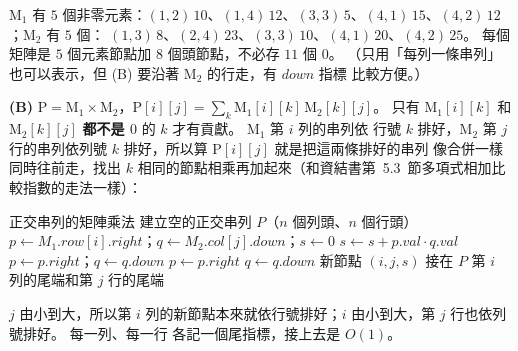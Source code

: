 \begin{pastsoln}
$\mathrm{M}_1$ 有 $5$ 個非零元素：$(1,2)\,10$、$(1,4)\,12$、$(3,3)\,5$、$(4,1)\,15$、$(4,2)\,12$；$\mathrm{M}_2$ 有 $5$ 個：
$(1,3)\,8$、$(2,4)\,23$、$(3,3)\,10$、$(4,1)\,20$、$(4,2)\,25$。 每個矩陣是 $5$ 個元素節點加 $8$ 個頭節點，不必存
$11$ 個 $0$。 （只用「每列一條串列」也可以表示，但 (B) 要沿著 $\mathrm{M}_2$ 的行走，有 $\mathit{down}$ 指標
比較方便。）

\textbf{(B)} $\mathrm{P} = \mathrm{M}_1 \times \mathrm{M}_2$，$\mathrm{P}[i][j] = \sum_k \mathrm{M}_1[i][k]\,\mathrm{M}_2[k][j]$。
只有 $\mathrm{M}_1[i][k]$ 和 $\mathrm{M}_2[k][j]$ \textbf{都不是 $0$} 的 $k$ 才有貢獻。 $\mathrm{M}_1$ 第 $i$ 列的串列依
行號 $k$ 排好，$\mathrm{M}_2$ 第 $j$ 行的串列依列號 $k$ 排好，所以算 $\mathrm{P}[i][j]$ 就是把這兩條排好的串列
像合併一樣同時往前走，找出 $k$ 相同的節點相乘再加起來（和資結書第~5.3~節多項式相加比較指數的走法一樣）：

\begin{pseudo}{正交串列的矩陣乘法}
    \State 建立空的正交串列 $P$（$n$ 個列頭、$n$ 個行頭）
            \State $p \gets M_1.\mathit{row}[i].\mathit{right}$；$q \gets M_2.\mathit{col}[j].\mathit{down}$；$s \gets 0$
                    \State $s \gets s + p.\mathit{val} \cdot q.\mathit{val}$
                    \State $p \gets p.\mathit{right}$；$q \gets q.\mathit{down}$
                    \State $p \gets p.\mathit{right}$
                \Else
                    \State $q \gets q.\mathit{down}$
                \EndIf
            \EndWhile
                \State 新節點 $(i, j, s)$ 接在 $P$ 第 $i$ 列的尾端和第 $j$ 行的尾端
            \EndIf
        \EndFor
    \EndFor
\EndProcedure
\end{pseudo}
$j$ 由小到大，所以第 $i$ 列的新節點本來就依行號排好；$i$ 由小到大，第 $j$ 行也依列號排好。 每一列、每一行
各記一個尾指標，接上去是 $O(1)$。


\end{pastsoln}
